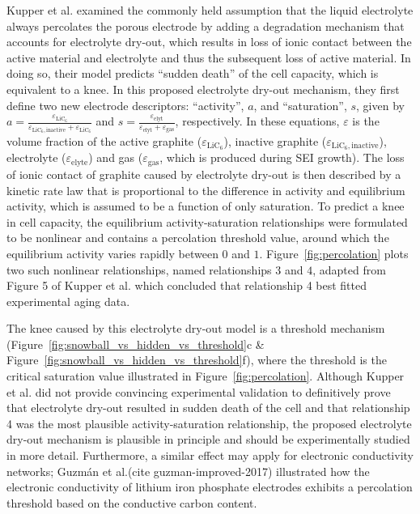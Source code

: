 \documentclass[journal=jpcl, manuscript=article, layout=onecolumn]{achemso}
\begin{document}
Kupper et al.\cite{kupper_end--life_2018} examined the commonly held assumption that the liquid electrolyte always percolates the porous electrode by adding a degradation mechanism that accounts for electrolyte dry-out, which results in loss of ionic contact between the active material and electrolyte and thus the subsequent loss of active material. In doing so, their model predicts ``sudden death'' of the cell capacity, which is equivalent to a knee. In this proposed electrolyte dry-out mechanism, they first define two new electrode descriptors: ``activity'', $a$, and ``saturation'', $s$, given by $a = \frac{\varepsilon_{\text{LiC}_6}}{\varepsilon_{\text{LiC}_6,\text{inactive}}+\varepsilon_{\text{LiC}_6}}$ and $s = \frac{\varepsilon_\text{elyt}}{\varepsilon_\text{elyt}+\varepsilon_\text{gas}}$, respectively. In these equations, $\varepsilon$ is the volume fraction of the active graphite ($\varepsilon_{\text{LiC}_6}$), inactive graphite ($\varepsilon_{\text{LiC}_6,\text{inactive}}$), electrolyte ($\varepsilon_{\text{elyte}}$) and gas ($\varepsilon_{\text{gas}}$, which is produced during SEI growth). The loss of ionic contact of graphite caused by electrolyte dry-out is then described by a kinetic rate law that is proportional to the difference in activity and equilibrium activity, which is assumed to be a function of only saturation. To predict a knee in cell capacity, the equilibrium activity-saturation relationships were formulated to be nonlinear and contains a percolation threshold value, around which the equilibrium activity varies rapidly between $0$ and $1$. Figure~\ref{fig:percolation} plots two such nonlinear relationships, named relationships $3$ and $4$, adapted from Figure 5 of Kupper et al.\cite{kupper_end--life_2018} which concluded that relationship 4 best fitted experimental aging data.

The knee caused by this electrolyte dry-out model is a threshold mechanism (Figure~\ref{fig:snowball_vs_hidden_vs_threshold}c \& Figure~\ref{fig:snowball_vs_hidden_vs_threshold}f), where the threshold is the critical saturation value illustrated in Figure~\ref{fig:percolation}. Although Kupper et al.\cite{kupper_end--life_2018} did not provide convincing experimental validation to definitively prove that electrolyte dry-out resulted in sudden death of the cell and that relationship 4 was the most plausible activity-saturation relationship, the proposed electrolyte dry-out mechanism is plausible in principle and should be experimentally studied in more detail. Furthermore, a similar effect may apply for electronic conductivity networks; Guzmán et al.(cite guzman-improved-2017) illustrated how the electronic conductivity of lithium iron phosphate electrodes exhibits a percolation threshold based on the conductive carbon content.
\end{document}
